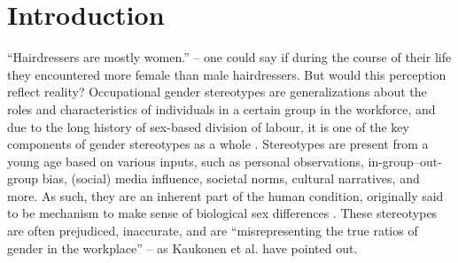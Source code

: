 \documentclass[runningheads]{llncs}
\begin{document}
\section{Introduction}

``Hairdressers are mostly women.'' -- one could say if during the course of their life they encountered more female than male hairdressers. But would this perception reflect reality? 
Occupational gender stereotypes are generalizations about the roles and characteristics of individuals in a certain group in the workforce, and due to the long history of sex-based division of labour, it is one of the key components of gender stereotypes as a whole \citep{deaux_1984_structure}. Stereotypes are present from a young age \citep{canessapollard_2022_development} based on various inputs, such as personal observations, in-group--out-group bias, (social) media influence, societal norms, cultural narratives, and more. As such, they are an inherent part of the human condition, originally said to be mechanism to make sense of biological sex differences \citep{levanon_2016_persistence}. These stereotypes are often prejudiced, inaccurate, and are ``misrepresenting the true ratios of gender in the workplace'' \citep{garnham_2015_true,gygax_2016_what} -- as Kaukonen et al. \citep{kaukonen_2025_gender} have pointed out.
\end{document}
